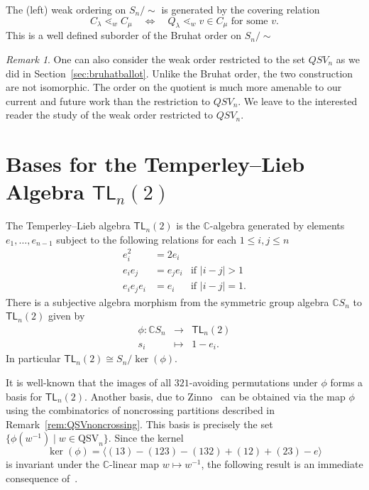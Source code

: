 \documentclass[12pt]{amsart}
\theoremstyle{definition}
\theoremstyle{remark}
\newtheorem{rem}[equation]{Remark}
\numberwithin{equation}{section}
\newcommand{\CC}{\mathbb{C}}
\newcommand{\TL}{\mathsf{TL}}
\newcommand{\QSV}{\mathrm{QSV}}
\begin{document}
The (left) weak ordering on $S_n/\!\!\sim$ is generated by the  covering relation
  $$ C_{\lambda} \lessdot_w C_{\mu} \quad\iff\quad  Q_\lambda \lessdot_w  v\in C_{\mu} \text{ for some } v.$$
 This is a well defined suborder of the Bruhat order on $S_n/\!\!\sim$
 
 \begin{rem} 
  One can also consider the weak order restricted to the set $QSV_n$ as we did in Section~\ref{sec:bruhatballot}.
  Unlike the Bruhat order, the two construction are not isomorphic. The order on the quotient is much more amenable to our
  current and future work than the restriction to $QSV_n$. We leave to the interested reader the study of the weak order
  restricted to $QSV_n$.
 \end{rem}


\section{Bases for the Temperley--Lieb Algebra $\TL_{n}(2)$}

The Temperley--Lieb algebra $\TL_{n}(2)$ is the $\CC$-algebra generated by elements $e_{1}, \ldots, e_{n-1}$ subject to the following relations for each $1 \le i, j \le n$
\[
\begin{array}{rll}
e_{i}^{2} &= 2 e_{i} \\
e_{i}e_{j} &= e_{j}e_{i} & \text{if $|i - j| > 1$} \\
e_{i} e_{j} e_{i} &= e_{i} & \text{if $|i - j| = 1$}.
\end{array}
\]
There is a subjective algebra morphism from the symmetric group algebra $\CC S_{n}$ to $\TL_{n}(2)$ given by 
\[
\begin{array}{rcl}
\phi: \CC S_{n} & \longrightarrow & \TL_{n}(2) \\
s_{i} & \longmapsto & 1 - e_{i}.
\end{array}
\]
In particular $\TL_{n}(2)\cong S_n/\ker(\phi)$.

It is well-known that the images of all $321$-avoiding permutations under $\phi$ forms a basis for $\TL_{n}(2)$.  
Another basis, due to Zinno~\cite{Zinno} can be obtained via the map $\phi$ using the combinatorics of noncrossing partitions described in Remark~\ref{rem:QSVnoncrossing}.  This basis is precisely the set $\{\phi(w^{-1}) \;|\; w \in \QSV_{n}\}$.  Since the kernel
\[
\ker(\phi) = \langle (13) - (123) - (132) + (12) + (23) - e \rangle
\]
is invariant under the $\CC$-linear map $w \mapsto w^{-1}$, the following result is an immediate consequence of~\cite[Theorem 2]{Zinno}.
\end{document}
